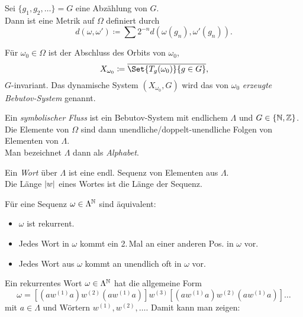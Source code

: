 \documentclass{cheat-sheet}
\newcommand{\clos}[1]{\overline{#1}} %
\begin{document}
\begin{bem}
  Sei $\{ g_1, g_2, \ldots \} = G$ eine Abzählung von $G$. \\
  Dann ist eine Metrik auf $\Omega$ definiert durch
  \[ d(\omega, \omega') \coloneqq \sum 2^{-n} d(\omega(g_n), \omega'(g_n)). \]
\end{bem}

\begin{defn}
  Für $\omega_0 \in \Omega$ ist der Abschluss des Orbits von $\omega_0$,
  \[ X_{\omega_0} \coloneqq \clos{\Set{T_g(\omega_0)}{g \in G}}, \]
  $G$-invariant. Das dynamische System $(X_{\omega_0}, G)$ wird das von $\omega_0$ \emph{erzeugte Bebutov-System} genannt.
\end{defn}

\begin{defn}
  Ein \emph{symbolischer Fluss} ist ein Bebutov-System mit endlichem $\Lambda$ und $G \in \{ \mathbb{N}, \mathbb{Z} \}$.
  Die Elemente von $\Omega$ sind dann unendliche/doppelt-unendliche Folgen von Elementen von $\Lambda$. \\
  Man bezeichnet $\Lambda$ dann als \emph{Alphabet}.
\end{defn}


\begin{defn}
  Ein \emph{Wort} über $\Lambda$ ist eine endl. Sequenz von Elementen aus $\Lambda$. \\
  Die Länge $\lvert w\rvert$ eines Wortes ist die Länge der Sequenz.
\end{defn}

\begin{prop}
  Für eine Sequenz $\omega \in \Lambda^{\mathbb{N}}$ sind äquivalent:
  \begin{itemize}
    \item $\omega$ ist rekurrent.
    \item Jedes Wort in $\omega$ kommt ein 2.\,Mal an einer anderen Pos. in $\omega$ vor.
    \item Jedes Wort aus $\omega$ kommt an unendlich oft in $\omega$ vor.
  \end{itemize}
\end{prop}

\begin{bem}
  Ein rekurrentes Wort $\omega \in \Lambda^{\mathbb{N}}$ hat die allgemeine Form
  \[ \omega = [(aw^{(1)}a)w^{(2)}(aw^{(1)}a)]w^{(3)}[(aw^{(1)}a)w^{(2)}(aw^{(1)}a)]\ldots \]
  mit $a \in \Lambda$ und Wörtern $w^{(1)}, w^{(2)}, \ldots$.
  Damit kann man zeigen:
\end{bem}
\end{document}
